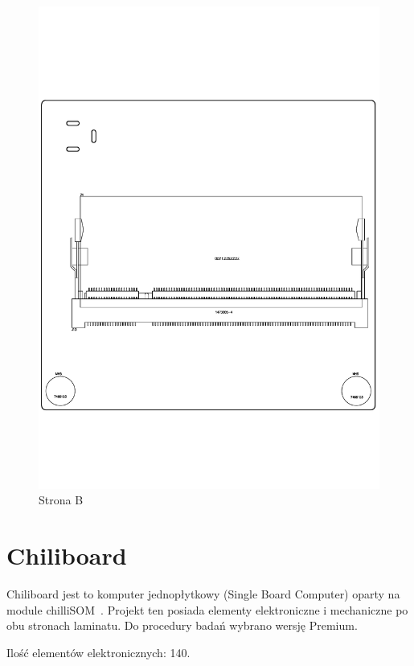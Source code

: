 \begin{figure}[!htb]
\begin{minipage}{0.5\textwidth}
		\includegraphics[width=0.9\linewidth,clip, trim=0cm 4cm 0cm 4cm]{./chapters/chapter5/liteboard_B.pdf}
		\caption{Strona B}\label{chilli:StronaB}
	\end{minipage}
\end{figure}


\section{Chiliboard}

Chiliboard jest to komputer jednopłytkowy (Single Board Computer) oparty na module chilliSOM~\cite{chiliboard}. Projekt ten posiada elementy elektroniczne i mechaniczne po obu stronach laminatu. Do procedury badań wybrano wersję Premium.

\breakparagraph{}
Ilość elementów elektronicznych: 140.

